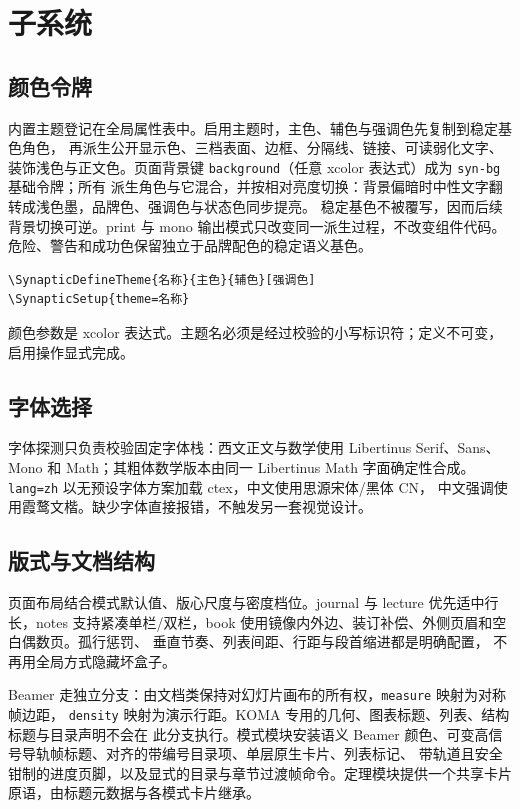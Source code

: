 \documentclass[a4paper,11pt]{scrartcl}
\begin{document}
\section{子系统}

\subsection{颜色令牌}

内置主题登记在全局属性表中。启用主题时，主色、辅色与强调色先复制到稳定基色角色，
再派生公开显示色、三档表面、边框、分隔线、链接、可读弱化文字、装饰浅色与正文色。页面背景键
\texttt{background}（任意 xcolor 表达式）成为 \texttt{syn-bg} 基础令牌；所有
派生角色与它混合，并按相对亮度切换：背景偏暗时中性文字翻转成浅色墨，品牌色、强调色与状态色同步提亮。
稳定基色不被覆写，因而后续背景切换可逆。print 与 mono 输出模式只改变同一派生过程，不改变组件代码。
危险、警告和成功色保留独立于品牌配色的稳定语义基色。

\begin{verbatim}
\SynapticDefineTheme{名称}{主色}{辅色}[强调色]
\SynapticSetup{theme=名称}
\end{verbatim}

颜色参数是 xcolor 表达式。主题名必须是经过校验的小写标识符；定义不可变，
启用操作显式完成。

\subsection{字体选择}

字体探测只负责校验固定字体栈：西文正文与数学使用 Libertinus Serif、Sans、Mono
和 Math；其粗体数学版本由同一 Libertinus Math 字面确定性合成。\texttt{lang=zh}
以无预设字体方案加载 ctex，中文使用思源宋体/黑体 CN，
中文强调使用霞鹜文楷。缺少字体直接报错，不触发另一套视觉设计。

\subsection{版式与文档结构}

页面布局结合模式默认值、版心尺度与密度档位。journal 与 lecture 优先适中行长，notes
支持紧凑单栏/双栏，book 使用镜像内外边、装订补偿、外侧页眉和空白偶数页。孤行惩罚、
垂直节奏、列表间距、行距与段首缩进都是明确配置，
不再用全局方式隐藏坏盒子。

Beamer 走独立分支：由文档类保持对幻灯片画布的所有权，\texttt{measure} 映射为对称帧边距，
\texttt{density} 映射为演示行距。KOMA 专用的几何、图表标题、列表、结构标题与目录声明不会在
此分支执行。模式模块安装语义 Beamer 颜色、可变高信号导轨帧标题、对齐的带编号目录项、单层原生卡片、列表标记、
带轨道且安全钳制的进度页脚，以及显式的目录与章节过渡帧命令。定理模块提供一个共享卡片原语，由标题元数据与各模式卡片继承。
\end{document}
